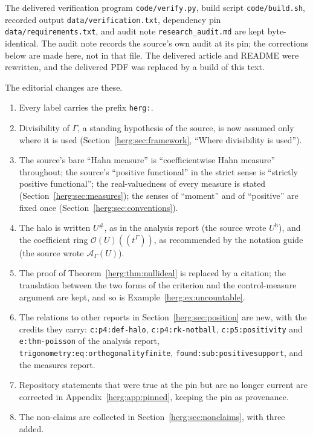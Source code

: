 \documentclass[11pt,letterpaper]{article}
\theoremstyle{definition}
\newcommand{\OU}[1]{\mathcal O(#1)((t^\Gamma))}
\newcommand{\halo}[1]{#1^{\#}}
\newcommand{\repo}[1]{\nolinkurl{#1}}%
\newcommand{\lbl}[1]{\nolinkurl{#1}}%
\numberwithin{equation}{section}
\begin{document}
The delivered verification program \repo{code/verify.py}, build script \repo{code/build.sh}, recorded output \repo{data/verification.txt}, dependency pin \repo{data/requirements.txt}, and audit note \repo{research_audit.md} are kept byte-identical. The audit note records the source's own audit at its pin; the corrections below are made here, not in that file. The delivered article and README were rewritten, and the delivered PDF was replaced by a build of this text.

The editorial changes are these.
\begin{enumerate}[label=(\arabic*)]
\item Every label carries the prefix \texttt{herg:}.
\item Divisibility of $\Gamma$, a standing hypothesis of the source, is now assumed only where it is used (Section~\ref{herg:sec:framework}, ``Where divisibility is used'').
\item The source's bare ``Hahn measure'' is ``coefficientwise Hahn measure'' throughout; the source's ``positive functional'' in the strict sense is ``strictly positive functional''; the real-valuedness of every measure is stated (Section~\ref{herg:sec:measures}); the senses of ``moment'' and of ``positive'' are fixed once (Section~\ref{herg:sec:conventions}).
\item The halo is written $\halo U$, as in the analysis report (the source wrote $U^{\mathrm h}$), and the coefficient ring $\OU{U}$, as recommended by the notation guide (the source wrote $\mathscr A_\Gamma(U)$).
\item The proof of Theorem~\ref{herg:thm:nullideal} is replaced by a citation; the translation between the two forms of the criterion and the control-measure argument are kept, and so is Example~\ref{herg:ex:uncountable}.
\item The relations to other reports in Section~\ref{herg:sec:position} are new, with the credits they carry: \lbl{c:p4:def-halo}, \lbl{c:p4:rk-notball}, \lbl{c:p5:positivity} and \lbl{e:thm-poisson} of the analysis report, \lbl{trigonometry:eq:orthogonalityfinite}, \lbl{found:sub:positivesupport}, and the measures report.
\item Repository statements that were true at the pin but are no longer current are corrected in Appendix~\ref{herg:app:pinned}, keeping the pin as provenance.
\item The non-claims are collected in Section~\ref{herg:sec:nonclaims}, with three added.
\end{enumerate}
\end{document}
